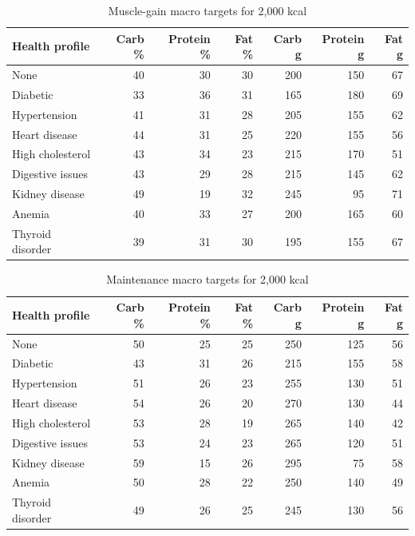 \begin{table}[H]
\centering
\caption{Muscle-gain macro targets for 2,000 kcal}
\begin{tabular}{lrrrrrr}
\toprule
Health profile & Carb \% & Protein \% & Fat \% & Carb g & Protein g & Fat g\\
\midrule
None & 40 & 30 & 30 & 200 & 150 & 67\\
Diabetic & 33 & 36 & 31 & 165 & 180 & 69\\
Hypertension & 41 & 31 & 28 & 205 & 155 & 62\\
Heart disease & 44 & 31 & 25 & 220 & 155 & 56\\
High cholesterol & 43 & 34 & 23 & 215 & 170 & 51\\
Digestive issues & 43 & 29 & 28 & 215 & 145 & 62\\
Kidney disease & 49 & 19 & 32 & 245 & 95 & 71\\
Anemia & 40 & 33 & 27 & 200 & 165 & 60\\
Thyroid disorder & 39 & 31 & 30 & 195 & 155 & 67\\
\bottomrule
\end{tabular}
\end{table}

\begin{table}[H]
\centering
\caption{Maintenance macro targets for 2,000 kcal}
\begin{tabular}{lrrrrrr}
\toprule
Health profile & Carb \% & Protein \% & Fat \% & Carb g & Protein g & Fat g\\
\midrule
None & 50 & 25 & 25 & 250 & 125 & 56\\
Diabetic & 43 & 31 & 26 & 215 & 155 & 58\\
Hypertension & 51 & 26 & 23 & 255 & 130 & 51\\
Heart disease & 54 & 26 & 20 & 270 & 130 & 44\\
High cholesterol & 53 & 28 & 19 & 265 & 140 & 42\\
Digestive issues & 53 & 24 & 23 & 265 & 120 & 51\\
Kidney disease & 59 & 15 & 26 & 295 & 75 & 58\\
Anemia & 50 & 28 & 22 & 250 & 140 & 49\\
Thyroid disorder & 49 & 26 & 25 & 245 & 130 & 56\\
\bottomrule
\end{tabular}
\end{table}

